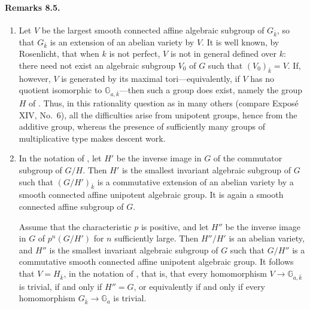 \paragraph{\textbf{Remarks 8.5.}}
\begin{enumerate}
\item[\emph{\SGAInlineRefTarget{sga3:xii:8.5:item:a}(a)}] Let \(V\) be the largest smooth connected affine
algebraic subgroup of \(G_{\bar k}\), so that \(G_{\bar k}\) is an
extension of an abelian variety by \(V\). It is well known, by
Rosenlicht, that when \(k\) is not perfect, \(V\) is not in general
defined over \(k\): there need not exist an algebraic subgroup
\(V_0\) of \(G\) such that \((V_0)_{\bar k}=V\). If, however, \(V\)
is generated by its maximal tori---equivalently, if \(V\) has no
quotient isomorphic to \(\mathbb G_{a,\bar k}\)---then such a group
does exist, namely the group \(H\) of . Thus, in this rationality
question as in many others (compare Exposé XIV, No.~6), all the
difficulties arise from unipotent groups, hence from the additive
group, whereas the presence of sufficiently many groups of
multiplicative type makes descent work.

\item[\emph{(b)}] In the notation of , let \(H'\) be the inverse
image in \(G\) of the commutator subgroup of \(G/H\). Then \(H'\) is
the smallest invariant algebraic subgroup of \(G\) such that
\((G/H')_{\bar k}\) is a commutative extension of an abelian variety
by a smooth connected affine unipotent algebraic group. It is again
a smooth connected affine subgroup of \(G\).

Assume that the characteristic \(p\) is positive, and let \(H''\)
be the inverse image in \(G\) of \(p^n(G/H')\) for \(n\) sufficiently
large. Then \(H''/H'\) is an abelian variety, and \(H''\) is the
smallest invariant algebraic subgroup of \(G\) such that \(G/H''\)
is a commutative smooth connected affine unipotent algebraic group.
It follows that \(V=H_{\bar k}\), in the notation of \textup{},
that is, that every homomorphism \(V\to\mathbb G_{a,\bar k}\) is trivial,
if and only if \(H''=G\), or equivalently if and only if every
homomorphism \(G_{\bar k}\to\mathbb G_a\) is trivial.
\end{enumerate}

